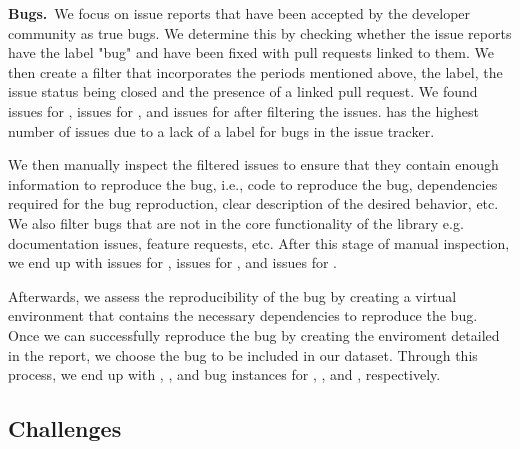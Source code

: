 \documentclass[sigconf,screen]{acmart}
\begin{document}
\textbf{Bugs.}~We focus on issue reports that have been accepted by
the developer community as true bugs. We determine this by checking
whether the issue reports have the label "bug" and have been fixed with pull
requests linked to them. We then create a filter that incorporates
the periods mentioned above, the label, the issue status being closed
and the presence of a linked pull request. We found \numtorchfiltered{}
issues for \torch, \numtffiltered{} issues for \tf, and \numjaxfiltered{}
issues for \jax after filtering the issues. \torch has the highest number
of issues due to a lack of a label for bugs in the issue tracker.

We then manually inspect the
filtered issues to ensure that they contain enough information to
reproduce the bug, i.e.,
code to reproduce the bug, dependencies required for the bug
reproduction, clear description of the desired behavior,
etc. We also filter bugs that are not in the core functionality
of the library e.g. documentation issues, feature requests, etc.
After this stage of manual inspection, we end up with \numtorchinspected{}
issues for \torch, \numtfinspected{} issues for \tf, and \numjaxinspected{}
issues for \jax.

Afterwards, we assess the reproducibility of the bug by creating a
virtual environment that contains the necessary dependencies to
reproduce the bug.
Once we can successfully reproduce the bug by creating the
enviroment detailed in the report, we choose the bug to be included in
our dataset. Through this process, we end up with \numtorchselected{},
\numtfselected{}, and \numjaxselected{} bug instances for \torch, \tf,
and \jax, respectively.


\subsection{Challenges}
\label{sec:challenges}
\end{document}
